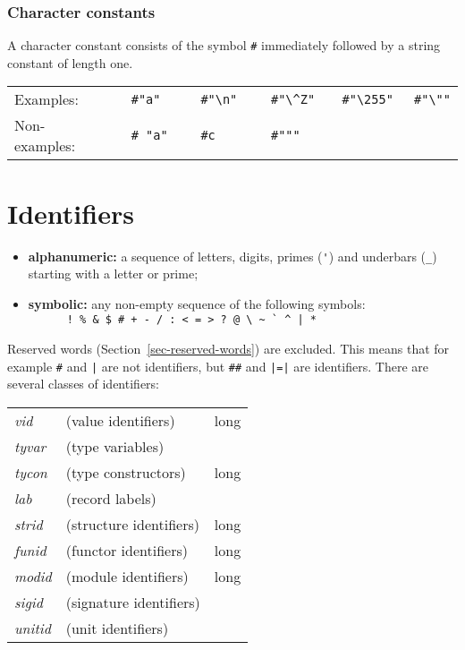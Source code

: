 \documentclass[fleqn,a4paper]{article}
\begin{document}
\subsubsection*{Character constants}

A character constant consists of the symbol \verb$#$ immediately
followed by a string constant of length one.

\begin{quot}
\begin{tabular}{@{}lclllll}
Examples:   & &  \verb$#"a"    $ & \verb$#"\n"   $ & \verb$#"\^Z"  $ &
\verb$#"\255" $ & \verb$#"\""$\\
Non-examples: & & \verb$# "a"$ & \verb$#c$ & \verb$#"""$ 
\end{tabular}
\end{quot}


\section{Identifiers}
\label{sec-identifiers}

\begin{itemize}
\item {\bf alphanumeric:} a sequence of letters, digits, primes
  (\verb#'#) and underbars (\verb#_#) starting with a letter or prime;

\item {\bf symbolic:} any non-empty sequence of the following symbols:\\
\verb;      ! % & $ # + - / : < = > ? @ \ ~ ` ^ | *;
\end{itemize}

\noindent Reserved words (Section~\ref{sec-reserved-words}) are
excluded.  This means that for example \verb$#$ and \verb#|# are not
identifiers, but \verb$##$ and \verb#|=|# are identifiers.  There are
several classes of identifiers:

{\begin{center}
\begin{tabular}{@{}lll}
{\it vid }  &  (value identifiers)           &    long\\
{\it tyvar} &  (type variables)\\
{\it tycon} &  (type constructors)         &    long\\
{\it lab}   &  (record labels)\\
{\it strid} &  (structure identifiers)         &    long\\
{\it funid} &  (functor identifiers)         &    long\\
{\it modid} &  (module identifiers)         &    long\\
{\it sigid} &  (signature identifiers)\\
{\it unitid} &  (unit identifiers)
\end{tabular}
\end{center}}
\end{document}
